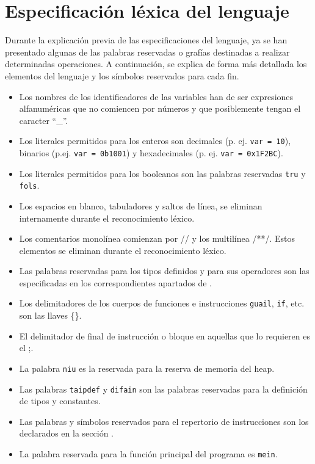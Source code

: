 \documentclass[10pt,a4paper]{article}
\begin{document}
\section{Especificación léxica del lenguaje}\label{sec:Especificación léxica del lenguaje}
Durante la explicación previa de las especificaciones del lenguaje, ya se han presentado algunas de las palabras reservadas o grafías destinadas a realizar determinadas operaciones. A continuación, se explica de forma más detallada los elementos del lenguaje y los símbolos reservados para cada fin.

\begin{itemize}
    \item Los nombres de los identificadores de las variables han de ser expresiones alfanuméricas que no comiencen por números y que posiblemente tengan el caracter ``\_''.
    \item Los literales permitidos para los enteros son decimales (p. ej. \texttt{var = 10}), binarios (p.ej. \texttt{var = 0b1001}) y hexadecimales (p. ej. \texttt{var = 0x1F2BC}).
    \item Los literales permitidos para los booleanos son las palabras reservadas \texttt{tru} y \texttt{fols}.
    \item Los espacios en blanco, tabuladores y saltos de línea, se eliminan internamente durante el reconocimiento léxico.
    \item Los comentarios monolínea comienzan por // y los multilínea /**/. Estos elementos se eliminan durante el reconocimiento léxico.
    \item Las palabras reservadas para los tipos definidos y para sus operadores son las especificadas en los correspondientes apartados de .
    \item Los delimitadores de los cuerpos de funciones e instrucciones \texttt{guail}, \texttt{if}, etc. son las llaves \{\}.
    \item El delimitador de final de instrucción o bloque en aquellas que lo requieren es el ;.
    \item La palabra \texttt{niu} es la reservada para la reserva de memoria del heap.
    \item Las palabras \texttt{taipdef} y \texttt{difain} son las palabras reservadas para la definición de tipos y constantes.
    \item Las palabras y símbolos reservados para el repertorio de instrucciones son los declarados en la sección .
    \item La palabra reservada para la función principal del programa es \texttt{mein}.
\end{itemize}
\end{document}

